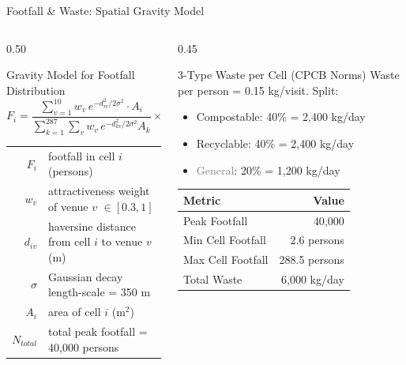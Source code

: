 \documentclass[aspectratio=169]{beamer}
\begin{document}
\begin{frame}{Footfall \& Waste: Spatial Gravity Model}
    \begin{columns}[T]
        \begin{column}{0.50\textwidth}
            \begin{block}{Gravity Model for Footfall Distribution}
                $$ F_i = \frac{\sum_{v=1}^{10} w_v \, e^{-d_{iv}^2/2\sigma^2} \cdot A_i}{\sum_{k=1}^{287}\sum_{v} w_v \, e^{-d_{kv}^2/2\sigma^2} A_k} \times N_{total} $$
                \footnotesize
                \begin{tabular}{r@{ = }l}
                    $F_i$ & footfall in cell $i$ (persons) \\
                    $w_v$ & attractiveness weight of venue $v$ $\in [0.3, 1]$ \\
                    $d_{iv}$ & haversine distance from cell $i$ to venue $v$ (m) \\
                    $\sigma$ & Gaussian decay length-scale = 350 m \\
                    $A_i$ & area of cell $i$ (m$^2$) \\
                    $N_{total}$ & total peak footfall = 40{,}000 persons \\
                \end{tabular}
            \end{block}
        \end{column}
        \begin{column}{0.45\textwidth}
            \begin{alertblock}{3-Type Waste per Cell (CPCB Norms)}
                Waste per person = 0.15 kg/visit. Split:
                \begin{itemize}
                    \item \textcolor{HighlightGreen}{Compostable}: 40\% = 2{,}400 kg/day
                    \item \textcolor{AccentBlue}{Recyclable}: 40\% = 2{,}400 kg/day
                    \item \textcolor{gray}{General}: 20\% = 1{,}200 kg/day
                \end{itemize}
            \end{alertblock}
            \begin{table}
                \centering\footnotesize
                \begin{tabular}{l r}
                    \toprule
                    \textbf{Metric} & \textbf{Value} \\ \midrule
                    Peak Footfall & 40{,}000 \\
                    Min Cell Footfall & 2.6 persons \\
                    Max Cell Footfall & 288.5 persons \\
                    Total Waste & 6{,}000 kg/day \\
                    \bottomrule
                \end{tabular}
            \end{table}
        \end{column}
    \end{columns}
\end{frame}
\end{document}

